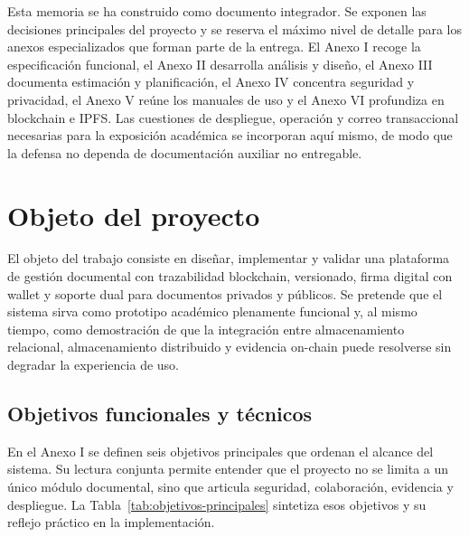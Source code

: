 \documentclass[11pt, a4paper]{article}
\begin{document}
Esta memoria se ha construido como documento integrador. Se exponen las decisiones principales del proyecto y se reserva el máximo nivel de detalle para los anexos especializados que forman parte de la entrega. El Anexo I recoge la especificación funcional, el Anexo II desarrolla análisis y diseño, el Anexo III documenta estimación y planificación, el Anexo IV concentra seguridad y privacidad, el Anexo V reúne los manuales de uso y el Anexo VI profundiza en blockchain e IPFS. Las cuestiones de despliegue, operación y correo transaccional necesarias para la exposición académica se incorporan aquí mismo, de modo que la defensa no dependa de documentación auxiliar no entregable.

\section{Objeto del proyecto}

El objeto del trabajo consiste en diseñar, implementar y validar una plataforma de gestión documental con trazabilidad blockchain, versionado, firma digital con wallet y soporte dual para documentos privados y públicos. Se pretende que el sistema sirva como prototipo académico plenamente funcional y, al mismo tiempo, como demostración de que la integración entre almacenamiento relacional, almacenamiento distribuido y evidencia on-chain puede resolverse sin degradar la experiencia de uso.

\subsection{Objetivos funcionales y técnicos}

En el Anexo I se definen seis objetivos principales que ordenan el alcance del sistema. Su lectura conjunta permite entender que el proyecto no se limita a un único módulo documental, sino que articula seguridad, colaboración, evidencia y despliegue. La Tabla~\ref{tab:objetivos-principales} sintetiza esos objetivos y su reflejo práctico en la implementación.
\end{document}
